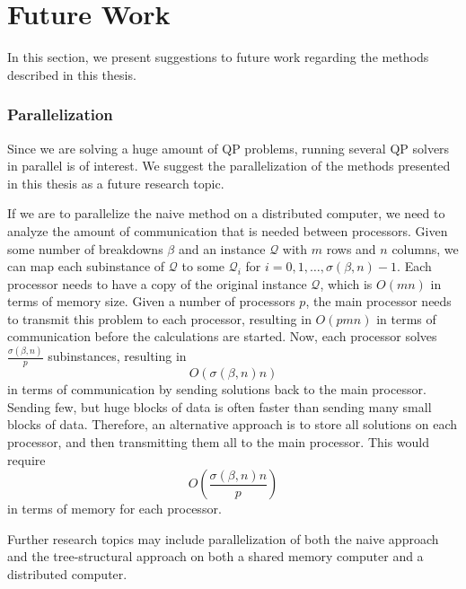 \documentclass[a4paper,12pt]{report}
\begin{document}
\section{Future Work}
In this section, we present suggestions to future work regarding the methods
described in this thesis.

\subsubsection{Parallelization}
Since we are solving a huge amount of QP problems, running several QP solvers
in parallel is of interest. We suggest the parallelization of the methods
presented in this thesis as a future research topic.


If we are to parallelize the naive method on a distributed computer, we need to
analyze the amount of communication that is needed between processors.
Given some number of breakdowns $\beta$ and an instance $\mathcal{Q}$ with
$m$ rows and $n$ columns, we can map each subinstance of $\mathcal{Q}$ to some
$\mathcal{Q}_i$ for $i=0,1,\ldots,\sigma(\beta,n) - 1$. Each processor needs to
have a copy of the original instance $\mathcal{Q}$, which is $O(mn)$ in terms
of memory size. Given a number of processors $p$, the main processor needs to
transmit this problem to each processor, resulting in $O(pmn)$ in terms of
communication before the calculations are started. Now, each
processor solves $\frac{\sigma(\beta, n)}{p}$ subinstances, resulting in
\[
O(\sigma(\beta, n)n)
\]
in terms of communication by sending solutions back to the main processor.
Sending few, but huge blocks of data is often faster than sending many small
blocks of data.
Therefore, an alternative approach is to store all solutions on each processor,
and then transmitting them all to the main processor.
This would require
\[
O\left(\frac{\sigma(\beta, n)n}{p}\right)
\]
in terms of memory for each processor.

Further research topics may include parallelization of both the naive approach
and the tree-structural approach on both a shared memory computer and a
distributed computer.


{}


\onecolumn

\end{document}

